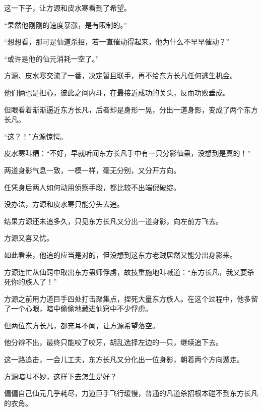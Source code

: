 \begin{this_body}
这一下子，让方源和皮水寒看到了希望。

“果然他刚刚的速度暴涨，是有限制的。”

“想想看，那可是仙道杀招，若一直催动得起来，他为什么不早早催动？”

“或许是他的仙元消耗一空了。”

方源、皮水寒交流了一番，决定暂且联手，再不给东方长凡任何逃生机会。

他们俩也是担心，彼此之间内斗，在最接近成功的关头，反而功败垂成。

但眼看着渐渐逼近东方长凡，后者却是身形一晃，分出一道身影，变成了两个东方长凡。

“这？！”方源惊愕。

皮水寒叫糟：“不好，早就听闻东方长凡手中有一只分影仙蛊，没想到是真的！”

两道身影气息一致，一模一样，毫无分别，又分开方向。

任凭身后两人如何动用侦察手段，都比较不出端倪破绽。

没办法，方源和皮水寒只能分头去追。

结果方源还未追多久，只见东方长凡又分出一道身影，向左前方飞去。

方源又喜又忧。

如此看来，他追的应当是对的，但没想到这东方老贼居然又能分出身影来。

方源连忙从仙窍中取出东方蛊师俘虏，故技重施地叫喊道：“东方长凡，我又要杀死你的族人了！”

方源之前用力道巨手四处打击聚集点，捏死大量东方族人。在这个过程中，他多留了一个心眼，暗中偷偷地藏进仙窍中不少俘虏。

但两位东方长凡，都充耳不闻，让方源希望落空。

他分辨不出，最终只能咬了咬牙，胡乱选择左边的一只，继续追下去。

这一路追击，一会儿工夫，东方长凡又分化出一位身影，朝着两个方向遁走。

方源暗叫不妙，这样下去怎生是好？

偏偏自己仙元几乎耗尽，力道巨手飞行缓慢，普通的凡道杀招根本碰不到东方长凡的衣角。

\end{this_body}

